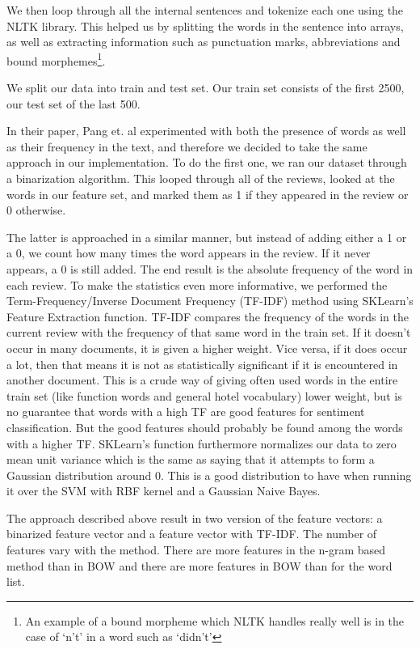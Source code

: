 \documentclass{article}
\begin{document}
We then loop through all the internal sentences and tokenize each one using the NLTK library. This helped us by splitting the words in the sentence into arrays, as well as extracting information such as punctuation marks, abbreviations and bound morphemes\footnote{An example of a bound morpheme which NLTK handles really well is in the case of `n't' in a word such as `didn't'}. 

We split our data into train and test set. Our train set consists of the first 2500, our test set of the last 500. 

In their paper, Pang et. al \cite{pangetal} experimented with both the presence of words as well as their frequency in the text, and therefore we decided to take the same approach in our implementation. To do the first one, we ran our dataset through a binarization algorithm. This looped through all of the reviews, looked at the words in our feature set, and marked them as 1 if they appeared in the review or 0 otherwise.  

The latter is approached in a similar manner, but instead of adding either a 1 or a 0, we count how many times the word appears in the review. If it never appears, a 0 is still added. The end result is the absolute frequency of the word in each review. To make the statistics even more informative, we performed the Term-Frequency/Inverse Document Frequency (TF-IDF) method using SKLearn's Feature Extraction function. TF-IDF compares the frequency of the words in the current review with the frequency of that same word in the train set. If it doesn't occur in many documents, it is given a higher weight. Vice versa, if it does occur a lot, then that means it is not as statistically significant if it is encountered in another document. This is a crude way of giving often used words in the entire train set (like function words and general hotel vocabulary) lower weight, but is no guarantee that words with a high TF are good features for sentiment classification. But the good features should probably be found among the words with a higher TF. SKLearn's function furthermore normalizes our data to zero mean unit variance which is the same as saying that it attempts to form a Gaussian distribution around 0. This is a good distribution to have when running it over the SVM with RBF kernel and a Gaussian Naive Bayes.

The approach described above result in two version of the feature vectors: a binarized feature vector and a feature vector with TF-IDF. The number of features vary with the method. There are more features in the n-gram based method than in BOW and there are more features in BOW than for the word list. 
\end{document}
